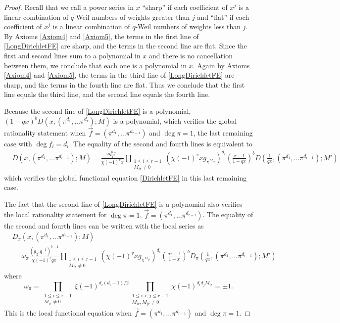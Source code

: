 \documentclass[11pt,letterpaper]{article}
\theoremstyle{definition}
\theoremstyle{remark}
\numberwithin{equation}{section}
\theoremstyle{dotless}
\begin{document}
\begin{proof}
Recall that we call a power series in $x$ ``sharp'' if each coefficient of $x^j$ is a linear combination of $q$-Weil numbers of weights greater than $j$ and ``flat'' if each coefficient of $x^j$ is a linear combination of $q$-Weil numbers of weights less than $j$. By Axioms \ref{Axiom4} and \ref{Axiom5}, the terms in the first line of \eqref{LongDirichletFE} are sharp, and the terms in the second line are flat. Since the first and second lines sum to a polynomial in $x$ and there is no cancellation between them, we conclude that each one is a polynomial in $x$. Again by Axioms \ref{Axiom4} and \ref{Axiom5}, the terms in the third line of \eqref{LongDirichletFE} are sharp, and the terms in the fourth line are flat. Thus we conclude that the first line equals the third line, and the second line equals the fourth line. 

Because the second line of \eqref{LongDirichletFE} is a polynomial, $(1-qx)^b D(x, (\pi^{d_1}, \ldots \pi^{d_r}); M)$ is a polynomial, which verifies the global rationality statement when $\vec{f}=(\pi^{d_1}, \ldots \pi^{d_{r-1}})$ and $\deg \pi = 1$, the last remaining case with $\deg f_i=d_i$. The equality of the second and fourth lines is equivalent to 
\begin{equation*} 
\begin{split}
& D(x, (\pi^{d_1}, \ldots \pi^{d_{r-1}}); M) =\frac{\omega g_{\chi^{v}} ^{b-1}}{\chi(-1)^v x} \prod_{\substack{1 \leq i \leq r-1 \\ M_{ir} \neq 0}} (\chi(-1)^v x g_{\chi^{M_{ir}}} )^{d_i} \left(\frac{x-1}{1- qx}\right)^b D\left(\frac{1}{qx}, (\pi^{d_1}, \ldots \pi^{d_{r-1}}); M'\right)
\end{split}
\end{equation*}
which verifies the global functional equation \eqref{DirichletFE} in this last remaining case. 

The fact that the second line of \eqref{LongDirichletFE} is a polynomial also verifies the local rationality statement for $\deg \pi=1$, $\vec{f}=(\pi^{d_1}, \ldots \pi^{d_{r-1}})$. The equality of the second and fourth lines can be written with the local series as 
\begin{equation*} 
\begin{split}
&D_\pi(x, (\pi^{d_1}, \ldots \pi^{d_{r-1}}); M) \\
&=\omega_\pi \frac{(g_{\chi^{v}}  q^{-1})^{b-1}}{\chi(-1)^v qx} \prod_{\substack{1 \leq i \leq r-1 \\ M_{ir} \neq 0}} (\chi(-1)^v x g_{\chi^{M_{ir}}} )^{d_i} \left(\frac{qx-1}{1- x}\right)^b D_\pi\left(\frac{1}{qx}, (\pi^{d_1}, \ldots \pi^{d_{r-1}}); M'\right)
\end{split}
\end{equation*}
where
\begin{equation*}
\omega_\pi= \prod_{\substack{1 \leq i \leq r-1 \\ M_{ir} \neq 0}} \xi(-1)^{d_i(d_i-1)/2} \prod_{\substack{1 \leq i<j \leq r-1 \\ M_{ir}, M_{jr} \neq 0}} \chi(-1)^{d_i d_j M_{ir} } = \pm 1.
\end{equation*}
This is the local functional equation when $\vec{f}=(\pi^{d_1}, \ldots \pi^{d_{r-1}})$ and $\deg \pi = 1$. 


\end{proof}
\end{document}
